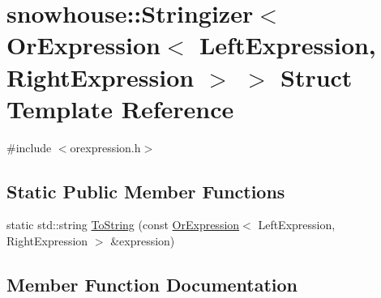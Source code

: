 \hypertarget{structsnowhouse_1_1Stringizer_3_01OrExpression_3_01LeftExpression_00_01RightExpression_01_4_01_4}{}\section{snowhouse\+::Stringizer$<$ Or\+Expression$<$ Left\+Expression, Right\+Expression $>$ $>$ Struct Template Reference}
\label{structsnowhouse_1_1Stringizer_3_01OrExpression_3_01LeftExpression_00_01RightExpression_01_4_01_4}


{\ttfamily \#include $<$orexpression.\+h$>$}

\subsection*{Static Public Member Functions}
\begin{DoxyCompactItemize}
\item 
static std\+::string \mbox{\hyperlink{structsnowhouse_1_1Stringizer_3_01OrExpression_3_01LeftExpression_00_01RightExpression_01_4_01_4_a83078dd525c93e2133eaaa31965c6eed}{To\+String}} (const \mbox{\hyperlink{structsnowhouse_1_1OrExpression}{Or\+Expression}}$<$ Left\+Expression, Right\+Expression $>$ \&expression)
\end{DoxyCompactItemize}


\subsection{Member Function Documentation}
\mbox{\label{structsnowhouse_1_1Stringizer_3_01OrExpression_3_01LeftExpression_00_01RightExpression_01_4_01_4_a83078dd525c93e2133eaaa31965c6eed}} 

